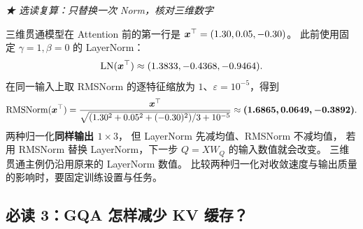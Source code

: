 \begin{example}[breakable]
\noindent\emph{\texorpdfstring{{\symboliconfont ★}}{★} 选读复算：只替换一次 Norm，核对三维数字}\par

三维贯通模型在 Attention 前的第一行是
$\boldsymbol{x}^\top=(1.30,0.05,-0.30)$。
此前使用固定 $\gamma=1,\beta=0$ 的 LayerNorm：
\[
\operatorname{LN}(\boldsymbol{x}^\top)\approx(1.3833,-0.4368,-0.9464).
\]
在同一输入上取 RMSNorm 的逐特征缩放为 $1$、$\varepsilon=10^{-5}$，得到
\[
\operatorname{RMSNorm}(\boldsymbol{x}^\top)
=\frac{\boldsymbol{x}^\top}{
\sqrt{(1.30^2+0.05^2+(-0.30)^2)/3+10^{-5}}}
\approx\boldsymbol{(1.6865,0.0649,-0.3892)}.
\]
两种归一化\textbf{同样输出 $1\times3$}，
但 LayerNorm 先减均值、RMSNorm 不减均值，
若用 RMSNorm 替换 LayerNorm，下一步 $Q=XW_Q$ 的输入数值就会改变。
三维贯通主例仍沿用原来的 LayerNorm 数值。
比较两种归一化对收敛速度与输出质量的影响时，要固定训练设置与任务。

\end{example}

\subsection{必读 3：GQA 怎样减少 KV 缓存？}
\label{sec:modern-gqa}
\label{concept:mqa}
\label{partq:architecture}

